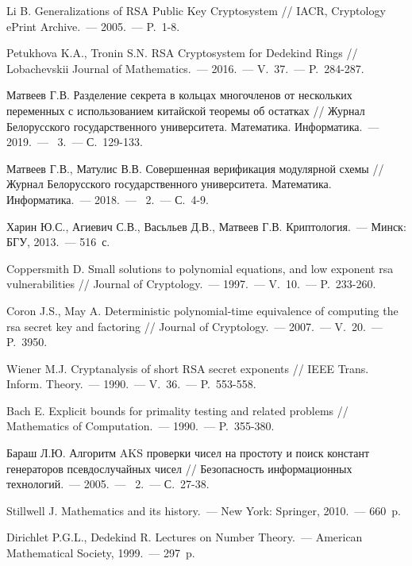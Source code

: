 \documentclass[_00_dissertation.tex]{subfiles}
\begin{document}
\begin{thebibliography}{99}
    Li B. Generalizations of RSA Public Key Cryptosystem // IACR, Cryptology ePrint Archive.~--- 2005.~--- P.~1-8.

    Petukhova K.A., Tronin S.N. RSA Cryptosystem for Dedekind Rings // Lobachevskii Journal of Mathematics.~--- 2016.~--- V.~37.~--- P.~284-287.

    Матвеев Г.В. Разделение секрета в кольцах многочленов от нескольких переменных с использованием китайской теоремы об остатках // Журнал Белорусского государственного университета. Математика. Информатика.~--- 2019.~--- \textnumero~3.~--- С.~129-133.

    Матвеев Г.В., Матулис В.В. Совершенная верификация модулярной схемы // Журнал Белорусского государственного университета. Математика. Информатика.~--- 2018.~--- \textnumero~2.~--- С.~4-9.

    Харин Ю.С., Агиевич С.В., Васьльев Д.В., Матвеев Г.В. Криптология.~--- Минск: БГУ, 2013.~--- 516~с.

    Coppersmith D. Small solutions to polynomial equations, and low exponent rsa vulnerabilities // Journal of Cryptology.~--- 1997.~--- V.~10.~--- P.~233-260.

    Coron J.S., May A. Deterministic polynomial-time equivalence of computing the rsa secret key and factoring // Journal of Cryptology.~--- 2007.~--- V.~20.~--- P.~3950.

    Wiener M.J. Cryptanalysis of short RSA secret exponents // IEEE Trans. Inform. Theory.~--- 1990.~--- V.~36.~--- P.~553-558.

    Bach E. Explicit bounds for primality testing and related problems // Mathematics of Computation.~--- 1990.~--- P.~355-380.

    Бараш Л.Ю. Алгоритм AKS проверки чисел на простоту и поиск констант генераторов псевдослучайных чисел // Безопасность информационных технологий.~--- 2005.~--- \textnumero~2.~--- С.~27-38.

    Stillwell J. Mathematics and its history.~--- New York: Springer, 2010.~--- 660~p.

    Dirichlet P.G.L., Dedekind R. Lectures on Number Theory.~--- American Mathematical Society, 1999.~--- 297~p.


\end{thebibliography}
\end{document}
